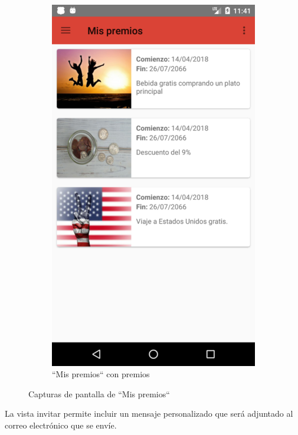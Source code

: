 \documentclass[twoside]{report}
\begin{document}
\begin{figure}[H]
\begin{center}
\begin{subfigure}[t]{.3\linewidth}
		\includegraphics[scale=0.2]{images/userguide/10.png}
		\caption{“Mis premios“ con premios}
	\end{subfigure}
\caption{Capturas de pantalla de “Mis premios“}
\end{center}
\end{figure}

La vista invitar permite incluir un mensaje personalizado que será adjuntado al correo electrónico que se envíe.
\end{document}
